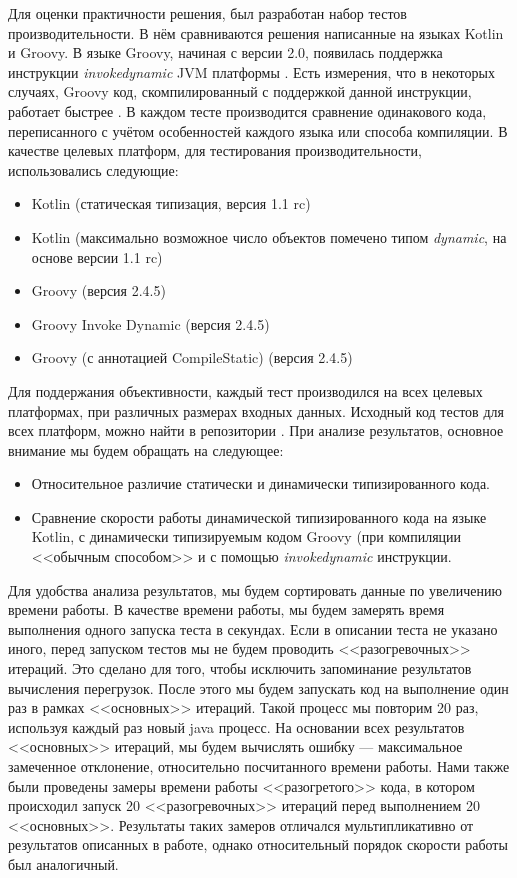 Для оценки практичности решения, был разработан набор тестов производительности. В нём сравниваются решения написанные на языках Kotlin и Groovy. В языке Groovy, начиная с версии 2.0, появилась поддержка инструкции \textit{invokedynamic} JVM платформы \cite{groovy:invokeDynamicSupport}. Есть измерения, что в некоторых случаях, Groovy код, скомпилированный с поддержкой данной инструкции, работает быстрее \cite{groovy:indyTest1}.
В каждом тесте производится сравнение одинакового кода, переписанного с учётом особенностей каждого языка или способа компиляции. В качестве целевых платформ, для тестирования производительности, использовались следующие:

\begin{itemize}
    \item Kotlin (статическая типизация, версия 1.1 rc) 
    \item Kotlin (максимально возможное число объектов помечено типом \textit{dynamic}, на основе версии 1.1 rc)
    \item Groovy (версия 2.4.5)
    \item Groovy Invoke Dynamic (версия 2.4.5)
    \item Groovy (с аннотацией CompileStatic) (версия 2.4.5)
\end{itemize}


Для поддержания объективности, каждый тест производился на всех целевых платформах, при различных размерах входных данных. Исходный код тестов для всех платформ, можно найти в репозитории \cite{github:myBenchs}. При анализе результатов, основное внимание мы будем обращать на следующее:

\begin{itemize}
    \item Относительное различие статически и динамически типизированного кода.
    \item Сравнение скорости работы динамической типизированного кода на языке Kotlin, с динамически типизируемым кодом Groovy (при компиляции <<обычным способом>> и с помощью \textit{invokedynamic} инструкции.
\end{itemize}

Для удобства анализа результатов, мы будем сортировать данные по увеличению времени работы. В качестве времени работы, мы будем замерять время выполнения одного запуска теста в секундах. Если в описании теста не указано иного, перед запуском тестов мы не будем проводить <<разогревочных>> итераций. Это сделано для того, чтобы исключить запоминание результатов вычисления перегрузок. После этого мы будем запускать код на выполнение один раз в рамках <<основных>> итераций. Такой процесс мы повторим 20 раз, используя каждый раз новый java процесс. На основании всех результатов <<основных>> итераций, мы будем вычислять ошибку --- максимальное замеченное отклонение, относительно посчитанного времени работы. Нами также были проведены замеры времени работы <<разогретого>> кода, в котором происходил запуск 20 <<разогревочных>> итераций перед выполнением 20 <<основных>>. Результаты таких замеров отличался мультипликативно от результатов описанных в работе, однако относительный порядок скорости работы был аналогичный.

